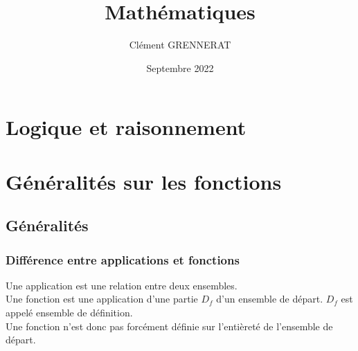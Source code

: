 \documentclass[13pt, twoside, a4paper, french]{report}
\newcommand*{\getSubject}{Mathématiques}
\begin{document}
\title{\getSubject}
\author{Clément GRENNERAT}
\date{Septembre 2022}


\chapter{Logique et raisonnement}\label{ch:logique-et-raisonnement}


\chapter{Généralités sur les fonctions}\label{ch:generalites-sur-les-fonctions}
  
  \section{Généralités}\label{sec:generalites}
    
    \subsection{Différence entre applications et fonctions}\label{subsec:difference-entre-applications-et-fonctions}
      
      Une application est une relation entre deux ensembles.\\
      Une fonction est une application d'une partie $D_f$ d'un ensemble de départ. $D_f$ est appelé ensemble de définition.\\
      Une fonction n'est donc pas forcément définie sur l'entièreté de l'ensemble de départ.
      
      \vspace*{10pt}
      
\end{document}
